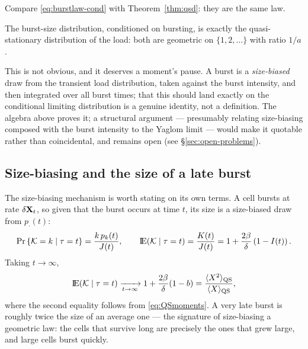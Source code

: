 Compare \eqref{eq:burstlaw-cond} with Theorem~\ref{thm:qsd}: they are the
same law.

\begin{corollary}[Burst size $=$ QSD]
\label{cor:burst-qsd}
The burst-size distribution, conditioned on bursting, is exactly the
quasi-stationary distribution of the load: both are geometric on
$\{1,2,\ldots\}$ with ratio $1/a$.
\end{corollary}

This is not obvious, and it deserves a moment's pause. A burst is a
\emph{size-biased} draw from the transient load distribution, taken against
the burst intensity, and then integrated over all burst times; that this
should land exactly on the conditional limiting distribution is a genuine
identity, not a definition. The algebra above proves it; a structural
argument --- presumably relating size-biasing composed with the burst
intensity to the Yaglom limit \cite{yaglom1947certain} --- would make it
quotable rather than coincidental, and remains open
(see \S\ref{sec:open-problems}).

\subsection{Size-biasing and the size of a late burst}
\label{sec:size-bias}

The size-biasing mechanism is worth stating on its own terms. A cell bursts
at rate $\delta{{\bf X}_t}$, so given that the burst occurs at time $t$, its size is
a size-biased draw from $p_\cdot(t)$:
\begin{equation}
{\text{Pr}\left\{\mathcal{K}=k\mid\tau=t\right\}}=\frac{k\,p_k(t)}{J(t)},
\qquad
{\rm I}\!{\rm E}(\mathcal{K}\mid\tau=t)=\frac{K(t)}{J(t)}
=1+\frac{2\beta}{\delta}\left(1-I(t)\right).
\label{eq:sizebias}
\end{equation}
Taking $t\to\infty$,
\begin{equation}
{\rm I}\!{\rm E}(\mathcal{K}\mid\tau=t)\xrightarrow[t\to\infty]{}
1+\frac{2\beta}{\delta}(1-b)
=\frac{\langle X^2\rangle_{\rm QS}}{\langle X\rangle_{\rm QS}},
\end{equation}
where the second equality follows from \eqref{eq:QSmoments}. A very late
burst is roughly twice the size of an average one --- the signature of
size-biasing a geometric law: the cells that survive long are precisely the
ones that grew large, and large cells burst quickly.
